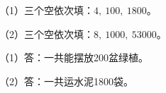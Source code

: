 
\begingroup\color{answerred}\noindent（1）三个空依次填：$4,\ 100,\ 1800$。\par
\noindent（2）三个空依次填：$8,\ 1000,\ 53000$。\par\par\endgroup
{}
\begingroup\color{answerred}\par\endgroup
{}
\begingroup\color{answerred}\noindent（1）答：一共能摆放200盆绿植。\par
\noindent（2）答：一共运水泥1800袋。\par\par\endgroup
